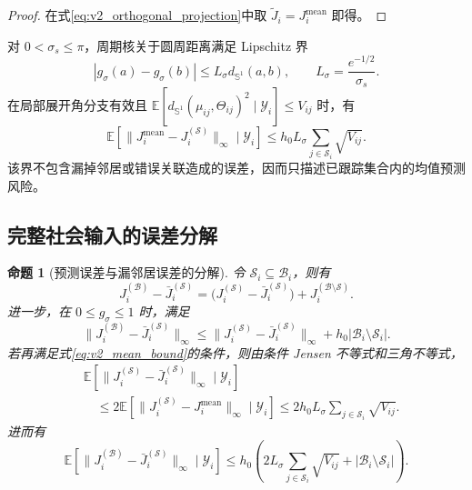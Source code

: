 \documentclass[UTF8,fontset=windows,11pt]{ctexart}
\theoremstyle{cnplain}
\newtheorem{proposition}[theorem]{命题}
\numberwithin{equation}{section}
\newcommand{\Sone}{\mathbb S^1}
\newcommand{\E}{\mathbb E}
\begin{document}
\begin{proof}
在式\eqref{eq:v2_orthogonal_projection}中取 $\widetilde J_i=J_i^{\mathrm{mean}}$ 即得。
\end{proof}

对 $0<\sigma_s\le\pi$，周期核关于圆周距离满足 Lipschitz 界
\begin{equation}
 |g_\sigma(a)-g_\sigma(b)|
 \le L_\sigma d_{\Sone}(a,b),
 \qquad L_\sigma=\frac{e^{-1/2}}{\sigma_s}.
 \label{eq:v2_lipschitz_kernel}
\end{equation}
在局部展开角分支有效且 $\E[d_{\Sone}(\mu_{ij},\Theta_{ij})^2\mid\mathcal Y_i]\le V_{ij}$ 时，有
\begin{equation}
 \E[\|J_i^{\mathrm{mean}}-J_i^{(\mathcal S)}\|_\infty\mid\mathcal Y_i]
 \le h_0L_\sigma\sum_{j\in\mathcal S_i}\sqrt{V_{ij}}.
 \label{eq:v2_mean_bound}
\end{equation}
该界不包含漏掉邻居或错误关联造成的误差，因而只描述已跟踪集合内的均值预测风险。

\subsection{完整社会输入的误差分解}

\begin{proposition}[预测误差与漏邻居误差的分解]
\label{prop:v2_full_decomposition}
令 $\mathcal S_i\subseteq\mathcal B_i$，则有
\begin{equation}
 J_i^{(\mathcal B)}-\bar J_i^{(\mathcal S)}
 =\bigl(J_i^{(\mathcal S)}-\bar J_i^{(\mathcal S)}\bigr)
 +J_i^{(\mathcal B\setminus\mathcal S)}.
 \label{eq:v2_full_decomposition}
\end{equation}
进一步，在 $0\le g_\sigma\le1$ 时，满足
\begin{equation}
 \|J_i^{(\mathcal B)}-\bar J_i^{(\mathcal S)}\|_\infty
 \le
 \|J_i^{(\mathcal S)}-\bar J_i^{(\mathcal S)}\|_\infty
 +h_0|\mathcal B_i\setminus\mathcal S_i|.
 \label{eq:v2_full_bound}
\end{equation}
若再满足式\eqref{eq:v2_mean_bound}的条件，则由条件 Jensen 不等式和三角不等式，
\begin{equation}
 \begin{aligned}
 &\E[\|J_i^{(\mathcal S)}-\bar J_i^{(\mathcal S)}\|_\infty\mid\mathcal Y_i]\\
 &\quad\le
 2\E[\|J_i^{(\mathcal S)}-J_i^{\mathrm{mean}}\|_\infty\mid\mathcal Y_i]
 \le2h_0L_\sigma\sum_{j\in\mathcal S_i}\sqrt{V_{ij}}.
 \end{aligned}
 \label{eq:v2_unc_absolute_bound}
\end{equation}
进而有
\begin{equation}
 \E[\|J_i^{(\mathcal B)}-\bar J_i^{(\mathcal S)}\|_\infty\mid\mathcal Y_i]
 \le h_0\left(
 2L_\sigma\sum_{j\in\mathcal S_i}\sqrt{V_{ij}}
 +|\mathcal B_i\setminus\mathcal S_i|
 \right).
 \label{eq:v2_total_input_bound}
\end{equation}
\end{proposition}
\end{document}
